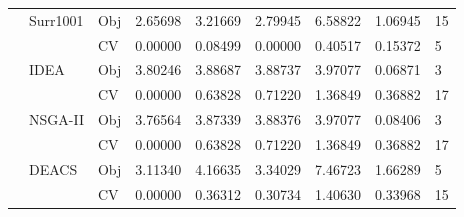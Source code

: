 \begin{table*}[!htb]
\begin{tabular}{lllllllll}
		& Surr1001                           & Obj                                & 2.65698                            & 3.21669                            & 2.79945                              & 6.58822                             & 1.06945                           & 15               \\
		&                                    & CV                                 & 0.00000                            & 0.08499                            & 0.00000                              & 0.40517                             & 0.15372                           & 5                \\
		& IDEA                               & Obj                                & 3.80246                            & 3.88687                            & 3.88737                              & 3.97077                             & 0.06871                           & 3                \\
		&                                    & CV                                 & 0.00000                            & 0.63828                            & 0.71220                              & 1.36849                             & 0.36882                           & 17               \\
		& NSGA-II                            & Obj                                & 3.76564                            & 3.87339                            & 3.88376                              & 3.97077                             & 0.08406                           & 3                \\
		&                                    & CV                                 & 0.00000                            & 0.63828                            & 0.71220                              & 1.36849                             & 0.36882                           & 17               \\
		& DEACS                              & Obj                                & 3.11340                            & 4.16635                            & 3.34029                              & 7.46723                             & 1.66289                           & 5                \\
		&                                    & CV                                 & 0.00000                            & 0.36312                            & 0.30734                              & 1.40630                             & 0.33968                           & 15               \\

\end{tabular}
\end{table*}
